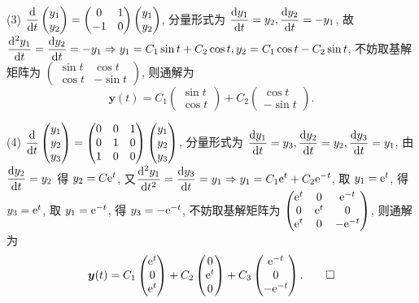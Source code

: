 \begin{solution}
  (3) $\displaystyle\frac{\mathop{}\!\mathrm{d}}{\mathop{}\!\mathrm{d} t}\begin{pmatrix}y_1\\y_2\end{pmatrix}=\begin{pmatrix}0&1\\-1&0\end{pmatrix}\begin{pmatrix}y_1\\y_2\end{pmatrix}$, 
  分量形式为 $\displaystyle\frac{\mathop{}\!\mathrm{d} y_1}{\mathop{}\!\mathrm{d} t}=y_2,\frac{\mathop{}\!\mathrm{d} y_2}{\mathop{}\!\mathrm{d} t}=-y_1$, 
  故 $\displaystyle\frac{\mathop{}\!\mathrm{d}^2y_1}{\mathop{}\!\mathrm{d} t}=\frac{\mathop{}\!\mathrm{d} y_2}{\mathop{}\!\mathrm{d} t}=-y_1\Rightarrow y_1=C_1\sin t+C_2\cos t,y_2=C_1\cos t-C_2\sin t$, 
  不妨取基解矩阵为 $\begin{pmatrix}\sin t&\cos t\\\cos t&-\sin t\end{pmatrix}$, 则通解为
  \[\bm{y}(t)=C_1\begin{pmatrix}\sin t\\\cos t\end{pmatrix}+C_2\begin{pmatrix}\cos t\\-\sin t\end{pmatrix}.\]

  (4) $\displaystyle\frac{\mathop{}\!\mathrm{d}}{\mathop{}\!\mathrm{d} t}\begin{pmatrix}y_1\\y_2\\y_3\end{pmatrix}=\begin{pmatrix}0&0&1\\0&1&0\\1&0&0\end{pmatrix}\begin{pmatrix}y_1\\y_2\\y_3\end{pmatrix}$, 
  分量形式为 $\displaystyle\frac{\mathop{}\!\mathrm{d} y_1}{\mathop{}\!\mathrm{d} t}=y_3,\frac{\mathop{}\!\mathrm{d} y_2}{\mathop{}\!\mathrm{d} t}=y_2,\frac{\mathop{}\!\mathrm{d} y_3}{\mathop{}\!\mathrm{d} t}=y_1$, 
  由 $\displaystyle\frac{\mathop{}\!\mathrm{d} y_2}{\mathop{}\!\mathrm{d} t}=y_2$
  得 $y_2=C\mathrm{e}^t$, 又$\displaystyle\frac{\mathop{}\!\mathrm{d}^2y_1}{\mathop{}\!\mathrm{d} t^2}=\frac{\mathop{}\!\mathrm{d} y_3}{\mathop{}\!\mathrm{d} t}=y_1\Rightarrow y_1=C_1\mathrm{e}^t+C_2\mathrm{e}^{-t}$, 
  取 $y_1=\mathrm{e}^t$, 得 $y_3=\mathrm{e}^t$, 取 $y_1=\mathrm{e}^{-t}$, 得 $y_3=-\mathrm{e}^{-t}$, 
  不妨取基解矩阵为 $\begin{pmatrix}\mathrm{e}^t&0&\mathrm{e}^{-t}\\0&\mathrm{e}^t&0\\\mathrm{e}^t&0&-\mathrm{e}^{-t}\end{pmatrix}$, 则通解为
  \[\bm{y}(t)=C_1\begin{pmatrix}\mathrm{e}^t\\0\\\mathrm{e}^t\end{pmatrix}+C_2\begin{pmatrix}0\\\mathrm{e}^t\\0\end{pmatrix}+C_3\begin{pmatrix}\mathrm{e}^{-t}\\0\\-\mathrm{e}^{-t}\end{pmatrix}.\qedhere\]
\end{solution}
